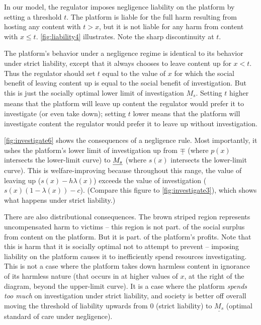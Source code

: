 In our model, the regulator imposes negligence liability on the platform by setting a threshold $t$. The platform is liable for the full harm resulting from hosting any content with $t > x$, but it is not liable for any harm from content with $x \le t$. \autoref{fig:liability4} illustrates. Note the sharp discontinuity at $t$.

The platform's behavior under a negligence regime is identical to its behavior under strict liability, except that it always chooses to leave content up for $x < t$. Thus the regulator should set $t$ equal to the value of $x$ for which the social benefit of leaving content up is equal to the social benefit of investigation. But this is just the socially optimal lower limit of investigation $\underline{M_s}$. Setting $t$ higher means that the platform will leave up content the regulator would prefer it to investigate (or even take down); setting $t$ lower means that the platform will investigate content the regulator would prefer it to leave up without investigation. 

\autoref{fig:investigate6} shows the consequences of a negligence rule. Most importantly, it ushes the platform's lower limit of investigation up from $\underline{\mp}$ (where $p(x)$ intersects the lower-limit curve) to $\underline{M_s}$ (where $s(x)$ intersects the lower-limit curve). This is welfare-improving because throughout this range, the value of leaving up ($s(x) - h\lambda(x)$) exceeds the value of investigation ($s(x)(1 - \lambda(x)) - c$). (Compare this figure to \autoref{fig:investigate3}), which shows what happens under strict liability.)

There are also distributional consequences. The brown striped region represents uncompensated harm to victims -- this region is not part. of the social surplus from content on the platform. But it is part. of the platform's profits. Note that this is harm that it is socially optimal not to attempt to prevent -- imposing liability on the platform causes it to inefficiently spend resources investigating.  This is not a case where the platform takes down harmless content in ignorance of its harmless nature (that occurs in at higher values of $x$, at the right of the diagram, beyond the upper-limit curve). It is a case where the platform \emph{spends too much} on investigation under strict liability, and society is better off overall moving the threshold of liability upwards from $0$ (strict liability) to $\underline{M_s}$ (optimal standard of care under negligence).
 
